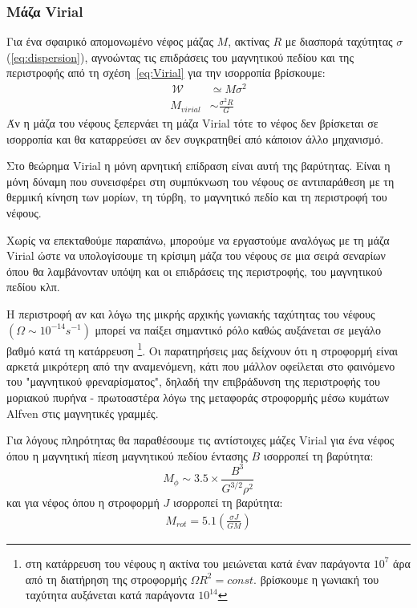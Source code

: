 \documentclass[a4paper,12pt]{memoir}
\newcommand{\WW}{\,\mathcal{W}}
\begin{document}
\subsubsection{Μάζα Virial}
\label{par:VirialMass}
Για ένα σφαιρικό απομονωμένο νέφος μάζας $M$, ακτίνας $R$ με διασπορά ταχύτητας $\sigma$ (\ref{eq:dispersion}), αγνοώντας τις επιδράσεις του μαγνητικού πεδίου και της περιστροφής από τη σχέση~\ref{eq:Virial} για την ισορροπία βρίσκουμε:
\begin{align}
\WW &\simeq M\sigma ^2 \\
M_{virial} &\sim \frac{\sigma ^2 R}{G} 
\end{align} 
Άν η μάζα του νέφους ξεπερνάει τη μάζα Virial τότε το νέφος δεν βρίσκεται σε ισορροπία και θα καταρρεύσει αν δεν συγκρατηθεί από κάποιον άλλο μηχανισμό.

Στο θεώρημα Virial η μόνη αρνητική επίδραση είναι αυτή της βαρύτητας. Είναι η μόνη δύναμη που συνεισφέρει στη συμπύκνωση του νέφους σε αντιπαράθεση με τη θερμική κίνηση των μορίων, τη τύρβη, το μαγνητικό πεδίο και τη περιστροφή του νέφους.

Χωρίς να επεκταθούμε παραπάνω, μπορούμε να εργαστούμε αναλόγως με τη μάζα Virial ώστε να υπολογίσουμε τη κρίσιμη μάζα του νέφους σε μια σειρά σεναρίων όπου θα λαμβάνονταν υπόψη και οι επιδράσεις της περιστροφής, του μαγνητικού πεδίου κλπ.

Η περιστροφή αν και λόγω της μικρής αρχικής γωνιακής ταχύτητας του νέφους $(\Omega \sim 10^{-14} s^{-1})$ μπορεί να παίξει σημαντικό ρόλο καθώς αυξάνεται σε μεγάλο βαθμό κατά τη κατάρρευση \footnote{στη κατάρρευση του νέφους η ακτίνα του μειώνεται κατά έναν παράγοντα $10^7$ άρα από τη διατήρηση της στροφορμής $\Omega R^2 = const.$ βρίσκουμε η γωνιακή του ταχύτητα αυξάνεται κατά παράγοντα $10^{14}$}. Οι παρατηρήσεις μας δείχνουν ότι η στροφορμή είναι αρκετά μικρότερη από την αναμενόμενη, κάτι που μάλλον οφείλεται στο φαινόμενο του "μαγνητικού φρεναρίσματος", δηλαδή την επιβράδυνση της περιστροφής του μοριακού πυρήνα - πρωτοαστέρα λόγω της μεταφοράς στροφορμής μέσω κυμάτων Alfven στις μαγνητικές γραμμές.

Για λόγους πληρότητας θα παραθέσουμε τις αντίστοιχες μάζες \cite{schulz_2012} Virial για ένα νέφος όπου η μαγνητική πίεση μαγνητικού πεδίου έντασης $B$ ισορροπεί τη βαρύτητα:
\begin{equation}
M_{\phi} \sim 3.5 \times \frac{B^3}{G^{3/2} \rho^2} 
\end{equation}
και για νέφος όπου η στροφορμή $J$ ισορροπεί τη βαρύτητα:
\begin{align}
M_{rot} = 5.1 \left( \frac{\sigma J}{G M} \right) 
\end{align}
\end{document}
